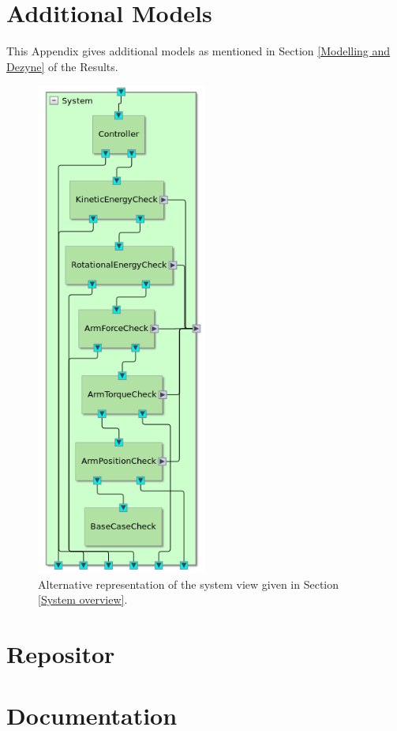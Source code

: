 \documentclass[12pt]{scrreprt}
\begin{document}
\begin{appendices}
\chapter{Additional Models}
\label{Additional Models}
This Appendix gives additional models as mentioned in Section \ref{Modelling and Dezyne} of the Results.
\begin{figure}
    \centering
    \includegraphics[width=0.5\textwidth]{Figures/results/modelling_figures/system_view/system_view_alt.png}
    \caption{Alternative representation of the system view given in Section \ref{System overview}.}
    \label{fig:system_view_alt}
\end{figure}
\chapter{Repositor}
\chapter{Documentation}
\end{appendices}
\end{document}
